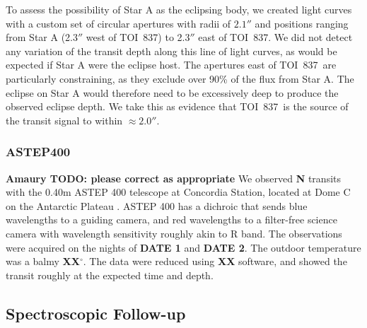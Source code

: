 \documentclass[12pt,twocolumn,tighten]{aastex63}
\newcommand{\tn}{TOI~837} %
\begin{document}
To assess the possibility of Star A as the eclipsing body,
we created light curves with a custom set of circular apertures
with radii of $2.1''$ and positions ranging from Star A (2.3$''$ west of \tn) to 2.3$''$
east of \tn.  We did not detect any variation of the transit depth
along this line of light curves, as would be expected if Star A were
the eclipse host.  The apertures east of \tn\ are particularly
constraining, as they exclude over 90\% of the flux from Star A.
The eclipse on Star A would therefore need to be excessively deep to
produce the observed eclipse depth.
We take this as evidence that \tn\ is the source of the transit signal
to within $\approx2.0''$.



\subsubsection{ASTEP400}

{\bf Amaury TODO: please correct as appropriate}
We observed {\bf N} transits with the 0.40m ASTEP 400 telescope at
Concordia Station, located at Dome C on the Antarctic Plateau
\citep{daban_astep_2010}.  ASTEP 400 has a dichroic that sends blue
wavelengths to a guiding camera, and red wavelengths to a filter-free
science camera with wavelength sensitivity roughly akin to R band.
The observations were acquired on the nights of {\bf DATE 1} and {\bf
DATE 2}.  The outdoor temperature was a balmy {\bf XX$^\circ$}.  The
data were reduced using {\bf XX} software, and showed the transit
roughly at the expected time and depth.


\subsection{Spectroscopic Follow-up}
\label{subsec:spectra}
\end{document}

